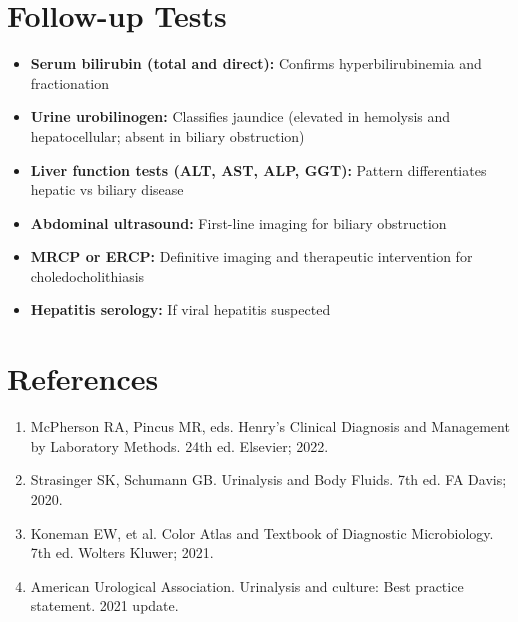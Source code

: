 \section*{Follow-up Tests}
\begin{itemize}
  \item \textbf{Serum bilirubin (total and direct):} Confirms hyperbilirubinemia and fractionation
  \item \textbf{Urine urobilinogen:} Classifies jaundice (elevated in hemolysis and hepatocellular; absent in biliary obstruction)
  \item \textbf{Liver function tests (ALT, AST, ALP, GGT):} Pattern differentiates hepatic vs biliary disease
  \item \textbf{Abdominal ultrasound:} First-line imaging for biliary obstruction
  \item \textbf{MRCP or ERCP:} Definitive imaging and therapeutic intervention for choledocholithiasis
  \item \textbf{Hepatitis serology:} If viral hepatitis suspected
\end{itemize}

\section*{References}
\begin{enumerate}
  \item McPherson RA, Pincus MR, eds. Henry's Clinical Diagnosis and Management by Laboratory Methods. 24th ed. Elsevier; 2022.
  \item Strasinger SK, Schumann GB. Urinalysis and Body Fluids. 7th ed. FA Davis; 2020.
  \item Koneman EW, et al. Color Atlas and Textbook of Diagnostic Microbiology. 7th ed. Wolters Kluwer; 2021.
  \item American Urological Association. Urinalysis and culture: Best practice statement. 2021 update.
\end{enumerate}

\clearpage